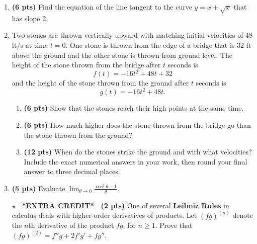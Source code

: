 \documentclass[12pt]{article}
\begin{document}
\begin{enumerate}[1.]
\item {\bf (6 pts)} %
Find the equation of the line tangent to the curve $y=x+\sqrt x$ that has slope 2.
\vspace{20pc}

\newpage

\item %
Two stones are thrown vertically upward with matching initial velocities of 48 ft/s at time $t=0$.  One stone is thrown from the edge of a bridge that is 32 ft above the ground and the other stone is thrown from ground level.  The height of the stone thrown from the bridge after $t$ seconds is
\[
f(t)=-16t^2+48t+32
\]
and the height of the stone thrown from the ground after $t$ seconds is 
\[
g(t)=-16t^2+48t.
\]
\begin{enumerate}
	\item {\bf (6 pts)} Show that the stones reach their high points at the same time.
	\vspace{15pc}
	
	\item {\bf (6 pts)} How much higher does the stone thrown from the bridge go than the stone thrown from the ground?
	\vspace{15pc}
	\newpage
	
	\item {\bf (12 pts)} When do the stones strike the ground and with what velocities?  Include the exact numerical answers in your work, then round your final answer to three decimal places.  
	\vspace{22pc}
\end{enumerate}

\item {\bf (5 pts)} %
Evaluate $\lim_{\theta\to 0}\frac{\cos^2{\theta}-1}{\theta}$.
\vspace{13pc}

\item[\Huge$\star$] {\bf ~*EXTRA CREDIT*~ (2 pts)} %
One of several \textbf{Leibniz Rules} in calculus deals with higher-order derivatives of products.  Let $(fg)^{(n)}$ denote the $n$th derivative of the product $fg$, for $n\geq 1$.
Prove that $(fg)^{(2)}=f''g+2f'g'+fg''$.
\vspace{12pc}


\end{enumerate}
\end{document}
